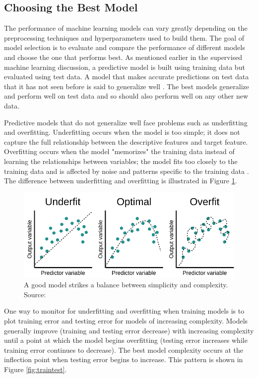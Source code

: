 \documentclass[pageno]{jpaper}
\begin{document}
\subsection{Choosing the Best Model}

The performance of machine learning models can vary greatly depending on the preprocessing techniques and hyperparameters used to build them. The goal of model selection is to evaluate and compare the performance of different models and choose the one that performs best. As mentioned earlier in the supervised machine learning discussion, a predictive model is built using training data but evaluated using test data. A model that makes accurate predictions on test data that it has not seen before is said to generalize well \cite{mitfundamentals}. The best models generalize and perform well on test data and so should also perform well on any other new data.

Predictive models that do not generalize well face problems such as underfitting and overfitting. Underfitting occurs when the model is too simple; it does not capture the full relationship between the descriptive features and target feature. Overfitting occurs when the model "memorizes" the training data instead of learning the relationships between variables; the model fits too closely to the training data and is affected by noise and patterns specific to the training data \cite{mitfundamentals}. The difference between underfitting and overfitting is illustrated in Figure \ref{fig:fit}.

\begin{figure}[hbt]
\centering
\includegraphics[width=0.75\linewidth]{fit.png}
\caption{A good model strikes a balance between simplicity and complexity.\\
Source: \cite{fit}}
\label{fig:fit}
\end{figure}

One way to monitor for underfitting and overfitting when training models is to plot training error and testing error for models of increasing complexity. Models generally improve (training and testing error decrease) with increasing complexity until a point at which the model begins overfitting (testing error increases while training error continues to decrease). The best model complexity occurs at the inflection point when testing error begins to increase. This pattern is shown in Figure \ref{fig:traintest}. 
\end{document}
